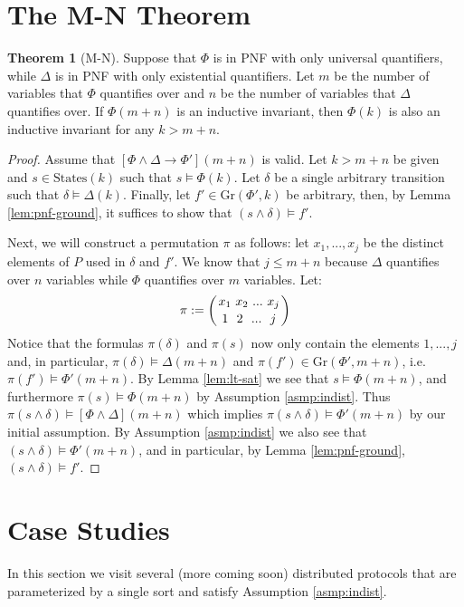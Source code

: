 \documentclass[12pt]{article}
\theoremstyle{definition}
\newtheorem{theorem}{Theorem}
\theoremstyle{remark}
\newcommand{\msp}{\text{ }}
\newcommand{\states}{\text{States}}
\newcommand{\gr}{\text{Gr}}
\newcommand{\perm}{\genfrac{}{}{0pt}{}}
\begin{document}
\section{The M-N Theorem}
\begin{theorem}[M-N]
  Suppose that $\Phi$ is in PNF with only universal quantifiers, while $\Delta$ is in PNF with only existential quantifiers.  Let $m$ be the number of variables that $\Phi$ quantifies over and $n$ be the number of variables that $\Delta$ quantifies over.  If $\Phi(m+n)$ is an inductive invariant, then $\Phi(k)$ is also an inductive invariant for any $k>m+n$.
\end{theorem}
\begin{proof}
  Assume that $[\Phi\land\Delta \rightarrow \Phi'](m+n)$ is valid.  Let $k>m+n$ be given and $s \in \states(k)$ such that $s \models \Phi(k)$.  Let $\delta$ be a single arbitrary transition such that $\delta \models \Delta(k)$.  Finally, let $f' \in \gr(\Phi',k)$ be arbitrary, then, by Lemma \ref{lem:pnf-ground}, it suffices to show that $(s \land \delta) \models f'$.

  Next, we will construct a permutation $\pi$ as follows: let $x_1,...,x_j$ be the distinct elements of $P$ used in $\delta$ and $f'$.  We know that $j \leq m+n$ because $\Delta$ quantifies over $n$ variables while $\Phi$ quantifies over $m$ variables.  Let:
  $$\pi := \left( \perm{x_1 \msp x_2 \msp ... \msp x_j}{1 \msp\msp 2 \msp\msp ... \msp\msp j} \right)$$
  Notice that the formulas $\pi(\delta)$ and $\pi(s)$ now only contain the elements $1,...,j$ and, in particular, $\pi(\delta) \models \Delta(m+n)$ and $\pi(f') \in \gr(\Phi',m+n)$, i.e. $\pi(f') \models \Phi'(m+n)$.  By Lemma \ref{lem:lt-sat} we see that $s \models \Phi(m+n)$, and furthermore $\pi(s) \models \Phi(m+n)$ by Assumption \ref{asmp:indist}.  Thus $\pi(s \land \delta) \models [\Phi\land\Delta](m+n)$ which implies $\pi(s \land \delta) \models \Phi'(m+n)$ by our initial assumption.  By Assumption \ref{asmp:indist} we also see that $(s \land \delta) \models \Phi'(m+n)$, and in particular, by Lemma \ref{lem:pnf-ground}, $(s \land \delta) \models f'$.

\end{proof}



\section{Case Studies}
In this section we visit several (more coming soon) distributed protocols that are parameterized by a single sort and satisfy Assumption \ref{asmp:indist}.
\end{document}
